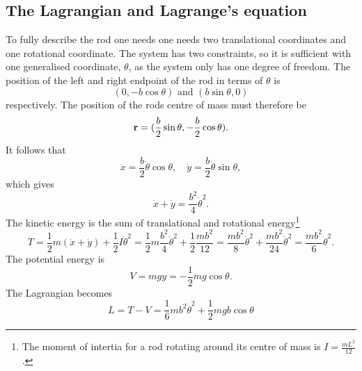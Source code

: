 \documentclass[11pt]{amsart}
\begin{document}
\subsection{The Lagrangian and Lagrange's equation}
To fully describe the rod one needs one needs two translational coordinates and one rotational coordinate. The system has two constraints, so it is sufficient with one generalised coordinate, $\theta$, as the system only has one degree of freedom. The position of the left and right endpoint of the rod in terms of $\theta$ is
\begin{equation*}
(0, -b\cos \theta) \text{ and } (b\sin \theta, 0)
\end{equation*}
respectively. The position of the rods centre of mass must therefore be
\begin{equation}
\label{eq:com}
\vb{r} = (\frac{b}{2}\sin \theta, -\frac{b}{2}\cos \theta).
\end{equation}
It follows that 
\begin{equation*}
\dot{x} = \frac{b}{2}\dot{\theta}\cos \theta, \quad \dot{y} = \frac{b}{2}\dot{\theta}\sin \theta,
\end{equation*}
which gives
\begin{equation}
\label{eq:xandy}
\dot{x} + \dot{y} = \frac{b^2}{4}\dot{\theta}^2.
\end{equation}
The kinetic energy is the sum of translational and rotational energy\footnote{The moment of intertia for a rod rotating around its centre of mass is $I=\frac{mL^2}{12}$.}
\begin{equation}
\label{eq:travail1}
T 	= \frac{1}{2}m(\dot{x} + \dot{y}) + \frac{1}{2}I\dot{\theta}^2
	= \frac{1}{2}m\frac{b^2}{4}\dot{\theta}^2 + \frac{1}{2}\frac{mb^2}{12}
	= \frac{mb^2}{8}\dot{\theta}^2 + \frac{mb^2}{24}\dot{\theta}^2 
	= \frac{mb^2}{6}\dot{\theta}^2.
\end{equation}
The potential energy is
\begin{equation}
\label{eq:voltage1}
V 	= mgy = -\frac{1}{2}mg\cos \theta.
\end{equation}
The Lagrangian becomes
\begin{equation}
\label{eq:lagrangian1}
L = T - V = \frac{1}{6}mb^2\dot{\theta}^2 + \frac{1}{2}mgb \cos \theta 
\end{equation}
\end{document}
